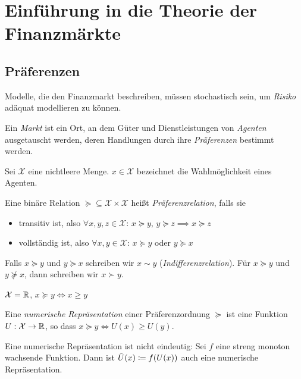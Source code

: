 \documentclass[a4paper,twoside,DIV15,BCOR12mm]{scrbook}
\newcommand{\cX}{\mathcal X}
\begin{document}
\renewcommand{\thesection}{\arabic{chapter}.\arabic{section}}
\renewcommand{\thechapter}{\Roman{chapter}}

\chapter{Einführung in die Theorie der Finanzmärkte}

\section{Präferenzen}

Modelle, die den Finanzmarkt beschreiben, müssen stochastisch sein, um \emph{Risiko} adäquat modellieren zu können.

Ein \emph{Markt} ist ein Ort, an dem Güter und Dienstleistungen von \emph{Agenten} ausgetauscht werden, deren Handlungen durch ihre \emph{Präferenzen} bestimmt werden.

Sei $\cX$ eine nichtleere Menge. $x\in\cX$ bezeichnet die Wahlmöglichkeit eines Agenten.

\begin{definition}
Eine binäre Relation $\succeq \subseteq \cX \times \cX$ heißt \emph{Präferenzrelation}, falls sie
\begin{itemize}
\item transitiv ist, also $\forall x,y,z \in\cX$: $x\succeq y$, $y\succeq z \implies x\succeq z$
\item vollständig ist, also $\forall x,y\in \cX$: $x\succeq y$ oder $y\succeq x$
\end{itemize}
Falls $x\succeq y$ und $y\succeq x$ schreiben wir $x\sim y$ (\emph{Indifferenzrelation}). Für $x\succeq y$ und $y\not\succeq x$, dann schreiben wir $x\succ y$.
\end{definition}

\begin{beispiel}
$\cX=\MdR$, $x\succeq y \iff x\ge y$
\end{beispiel}

\begin{definition}
Eine \emph{numerische Repräsentation} einer Präferenzordnung $\succeq$ ist eine Funktion $U:\cX\to \MdR$, so dass $x\succeq y \iff U(x) \ge U(y)$.
\end{definition}

\begin{bemerkung}
Eine numerische Repräsentation ist nicht eindeutig: Sei $f$ eine streng monoton wachsende Funktion. Dann ist $\tilde U(x) \da f(U(x))$ auch eine numerische Repräsentation.
\end{bemerkung}
\end{document}
